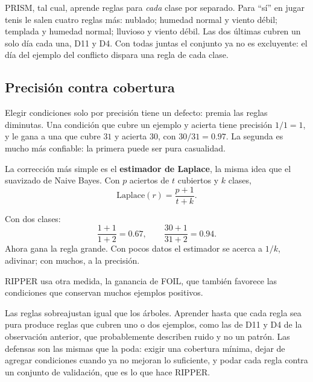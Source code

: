 \documentclass[11pt,letterpaper]{article}
\begin{document}
\begin{observacion}
    PRISM, tal cual, aprende reglas para \emph{cada} clase por separado.
    Para ``sí'' en jugar tenis le salen cuatro reglas más: nublado;
    humedad normal y viento débil; templada y humedad normal; lluvioso
    y viento débil. Las dos últimas cubren un solo día cada una, D11 y
    D4. Con todas juntas el conjunto ya no es excluyente: el día del
    ejemplo del conflicto dispara una regla de cada clase.
\end{observacion}


\subsection*{Precisión contra cobertura}

Elegir condiciones solo por precisión tiene un defecto: premia las
reglas diminutas. Una condición que cubre un ejemplo y acierta tiene
precisión $1/1 = 1$, y le gana a una que cubre $31$ y acierta $30$,
con $30/31 = 0.97$. La segunda es mucho más confiable: la primera
puede ser pura casualidad.

La corrección más simple es el \textbf{estimador de Laplace}, la misma
idea que el suavizado de Naive Bayes. Con $p$ aciertos de $t$
cubiertos y $k$ clases,
\[
    \text{Laplace}(r) = \frac{p + 1}{t + k} .
\]

\begin{ejemplo}
    Con dos clases:
    \[
        \frac{1 + 1}{1 + 2} = 0.67 ,
        \qquad
        \frac{30 + 1}{31 + 2} = 0.94 .
    \]
    Ahora gana la regla grande. Con pocos datos el estimador se acerca
    a $1/k$, adivinar; con muchos, a la precisión.
\end{ejemplo}

RIPPER usa otra medida, la ganancia de FOIL, que también favorece las
condiciones que conservan muchos ejemplos positivos.

\begin{ojo}
    Las reglas sobreajustan igual que los árboles. Aprender hasta que
    cada regla sea pura produce reglas que cubren uno o dos ejemplos,
    como las de D11 y D4 de la observación anterior, que probablemente
    describen ruido y no un patrón. Las defensas son las mismas que la
    poda: exigir una cobertura mínima, dejar de agregar condiciones
    cuando ya no mejoran lo suficiente, y podar cada regla contra un
    conjunto de validación, que es lo que hace RIPPER.
\end{ojo}
\end{document}

